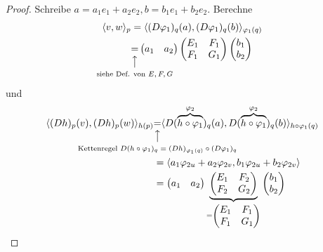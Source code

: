 \documentclass[../main.tex]{subfiles}
\begin{document}
\begin{proof}
    \noindent Schreibe $a=a_1e_1 +a_2e_2, b=b_1e_1+b_2e_2$. Berechne
    \begin{align*}
        \langle v,w \rangle _p &=\langle (D\varphi_1)_q(a), (D\varphi_1)_q(b)\rangle_{\varphi_1(q)} \\
        &\vertarrowbox[3ex]{=}{siehe Def. von $E,F,G$} \begin{pmatrix}
            a_1 & a_2
        \end{pmatrix}\begin{pmatrix}
            E_1 & F_1 \\ F_1 & G_1
        \end{pmatrix}\begin{pmatrix}
            b_1 \\ b_2
        \end{pmatrix}
    \end{align*} und 
    \begin{align*}
        \langle (Dh)_p(v), (Dh)_p(w) \rangle _{h(p)} &\vertarrowbox[3ex]{=}{Kettenregel $D(h\circ \varphi_1)_q=(Dh)_{\varphi_1(q)}\circ (D\varphi_1)_q$} \langle D(\overbrace{h \circ \varphi_1}^{\varphi_2})_q(a), D(\overbrace{h \circ \varphi_1}^{\varphi_2})_q(b)\rangle _{h\circ \varphi_1(q)}\\
        &= \langle a_1\varphi_{2u} + a_2\varphi_{2v}, b_1\varphi_{2u}+b_2\varphi_{2v}\rangle \\
        &= \begin{pmatrix}
            a_1 & a_2
        \end{pmatrix}\underbrace{\begin{pmatrix}
            E_1 & F_2 \\ F_2 & G_2
        \end{pmatrix}}_{=\begin{pmatrix}
            E_1 & F_1 \\ F_1 & G_1
        \end{pmatrix}}\begin{pmatrix}
            b_1 \\ b_2
        \end{pmatrix}
    \end{align*}
\end{proof}
\end{document}
